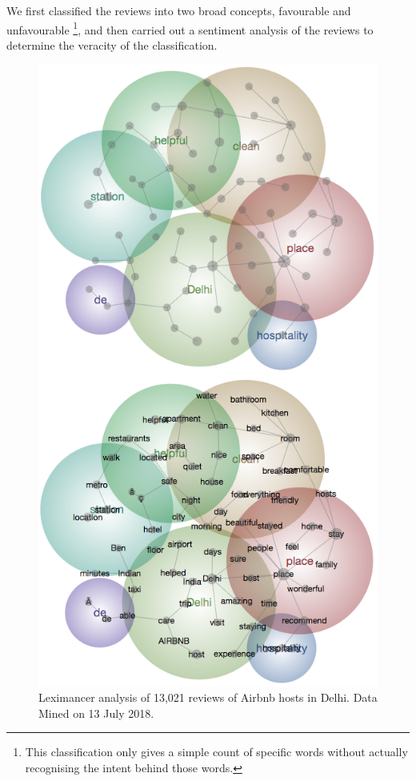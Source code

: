 \documentclass[a4paper, 12pt]{article}
\begin{document}
We first classified the reviews into two broad concepts, favourable and unfavourable \footnote{This classification only gives a simple count of specific words without actually recognising the intent behind those words.}, and then carried out a sentiment analysis of the reviews to determine the veracity of the classification.\\

\begin{figure}
\centering
\includegraphics[scale=0.8]{figure6.png} 
\caption{Leximancer analysis of 13,021 reviews of Airbnb hosts in Delhi. Data Mined on 13 July 2018.}
\end{figure}
\end{document}
